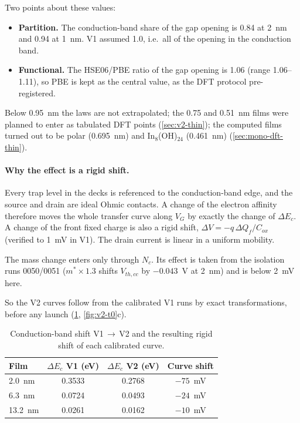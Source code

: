Two points about these values:
\begin{itemize}
\item \textbf{Partition.} The conduction-band share of the gap opening is 0.84 at 2~nm and 0.94 at 1~nm. V1 assumed
1.0, i.e.\ all of the opening in the conduction band.
\item \textbf{Functional.} The HSE06/PBE ratio of the gap opening is 1.06 (range 1.06--1.11), so PBE is kept as the
central value, as the DFT protocol pre-registered.
\end{itemize}
Below 0.95~nm the laws are not extrapolated; the 0.75 and 0.51~nm films were planned to enter as tabulated DFT points (\cref{sec:v2-thin}); the computed
films turned out to be polar (0.695~nm) and In$_8$(OH)$_{24}$ (0.461~nm) (\cref{sec:mono-dft-thin}).

\paragraph{Why the effect is a rigid shift.} Every trap level in the decks is referenced to the conduction-band edge,
and the source and drain are ideal Ohmic contacts. A change of the electron affinity therefore moves the whole
transfer curve along $V_G$ by exactly the change of $\Delta E_c$. A change of the front fixed charge is also a rigid
shift, $\Delta V = -q\,\Delta Q_f/C_{ox}$ (verified to 1~mV in V1). The drain current is linear in a uniform mobility.

The mass change enters only through $N_c$. Its effect is taken from the isolation runs 0050/0051 ($m^*\times1.3$
shifts $V_{th,cc}$ by $-0.043$~V at 2~nm) and is below 2~mV here.

So the V2 curves follow from the calibrated V1 runs by exact transformations, before any launch
(\cref{tab:v2-shift}, \cref{fig:v2-t0}c).

\begin{table}[htbp]\centering\small
\caption{Conduction-band shift V1\,$\to$\,V2 and the resulting rigid shift of each calibrated curve.}\label{tab:v2-shift}
\begin{tabular}{lccc}\toprule
Film & $\Delta E_c$ V1 (eV) & $\Delta E_c$ V2 (eV) & Curve shift\\\midrule
2.0~nm & 0.3533 & 0.2768 & $-75$~mV\\
6.3~nm & 0.0724 & 0.0493 & $-24$~mV\\
13.2~nm & 0.0261 & 0.0162 & $-10$~mV\\\bottomrule
\end{tabular}
\end{table}

